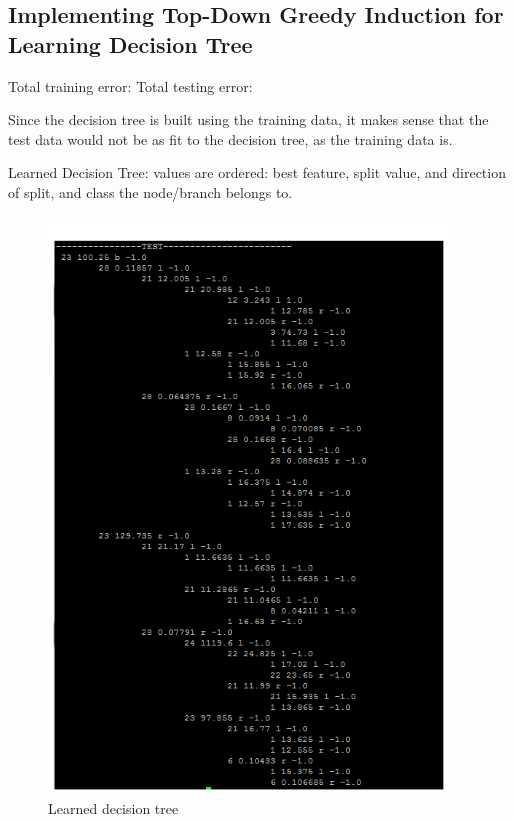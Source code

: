 \documentclass[letterpaper,10pt]{article}
\begin{document}
\subsection{Implementing Top-Down Greedy Induction for Learning Decision Tree}

Total training error:  \newline
Total testing error:  \newline

Since the decision tree is built using the training data, it makes sense that the test data would not be as fit to the decision tree, as the training data is.  

Learned Decision Tree: \newline
values are ordered: best feature, split value, and direction of split, and class the node/branch belongs to.  
     \begin{figure}[ht]
    \centering
   \includegraphics[width=300pt]{decisiontree.png}
    \caption{Learned decision tree}
    \label{fig:decisionTree}
    \end{figure}	
\end{document}
